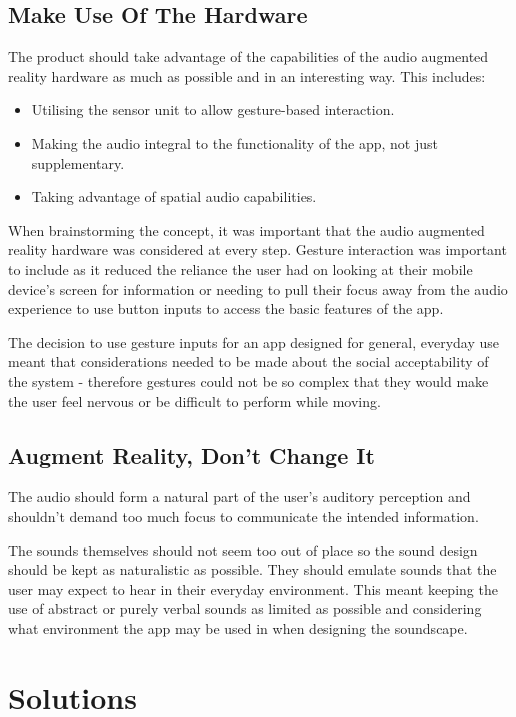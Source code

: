 \documentclass{l4proj}
\begin{document}
\subsection{Make Use Of The Hardware}The product should take advantage of the capabilities of the audio augmented reality hardware as much as possible and in an interesting way.
This includes: \begin{itemize}
    \item Utilising the sensor unit to allow gesture-based interaction.
    \item Making the audio integral to the functionality of the app, not just supplementary.
    \item Taking advantage of spatial audio capabilities.
\end{itemize}
When brainstorming the concept, it was important that the audio augmented reality hardware was considered at every step. Gesture interaction was important to include as it reduced the reliance the user had on looking at their mobile device's screen for information or needing to pull their focus away from the audio experience to use button inputs to access the basic features of the app.

The decision to use gesture inputs for an app designed for general, everyday use meant that considerations needed to be made about the social acceptability of the system - therefore gestures could not be so complex that they would make the user feel nervous or be difficult to perform while moving.

\subsection{Augment Reality, Don't Change It}

The audio should form a natural part of the user's auditory perception and shouldn't demand too much focus to communicate the intended information.

The sounds themselves should not seem too out of place so the sound design should be kept as naturalistic as possible. They should emulate sounds that the user may expect to hear in their everyday environment. This meant keeping the use of abstract or purely verbal sounds as limited as possible and considering what environment the app may be used in when designing the soundscape.

\section{Solutions}
\end{document}
